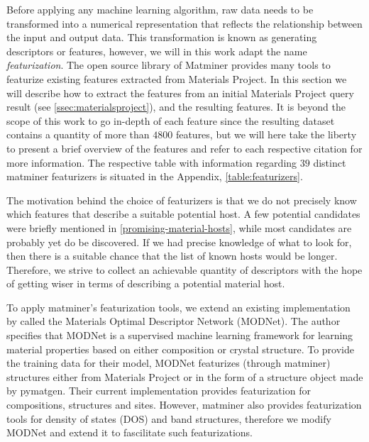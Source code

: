 Before applying any machine learning algorithm, raw data needs to be transformed into a numerical representation that reflects the relationship between the input and output data. This transformation is known as generating descriptors or features, however, we will in this work adapt the name \textit{featurization}. The open source library of Matminer provides many tools to featurize existing features extracted from Materials Project. In this section we will describe how to extract the features from an initial Materials Project query result (see \autoref{ssec:materialsproject}), and the resulting features. It is beyond the scope of this work to go in-depth of each feature since the resulting dataset contains a quantity of more than $4800$ features, but we will here take the liberty to present a brief overview of the features and refer to each respective citation for more information. The respective table with information regarding $39$ distinct matminer featurizers is situated in the Appendix, \autoref{table:featurizers}.

The motivation behind the choice of featurizers is that we do not precisely know which features that describe a suitable potential host. A few potential candidates were briefly mentioned in \autoref{promising-material-hosts}, while most candidates are probably yet do be discovered. If we  had precise knowledge of what to look for, then there is a suitable chance that the list of known hosts would be longer. Therefore, we strive to collect an achievable quantity of descriptors with the hope of getting wiser in terms of describing a potential material host.

To apply matminer's featurization tools, we extend an existing implementation by \citeauthor{Breuck2021} \cite{Breuck2021} called the Materials Optimal Descriptor Network (MODNet). The author \citeauthor{Breuck2021} specifies that MODNet is a supervised machine learning framework for learning material properties based on either composition or crystal structure. To provide the training data for their model, MODNet featurizes (through matminer) structures either from Materials Project or in the form of a structure object made by pymatgen. Their current implementation provides featurization for compositions, structures and sites. However, matminer also provides featurization tools for density of states (DOS) and band structures, therefore we modify MODNet and extend it to fascilitate such featurizations.



